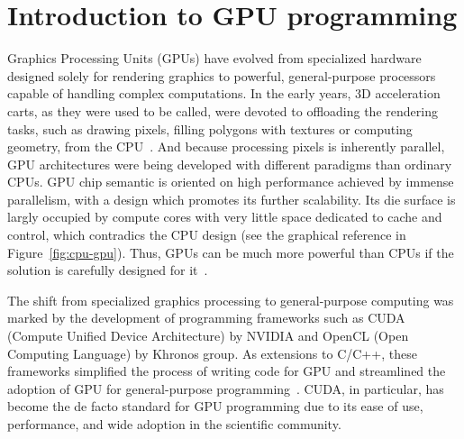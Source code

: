 \section{Introduction to GPU programming}


Graphics Processing Units (GPUs) have evolved from specialized hardware designed solely for rendering graphics to powerful, general-purpose processors capable of handling complex computations. In the early years, 3D acceleration carts, as they were used to be called, were devoted to offloading the rendering tasks, such as drawing pixels, filling polygons with textures or computing geometry, from the CPU~\cite{pratx2011gpu}. And because processing pixels is inherently parallel, GPU architectures were being developed with different paradigms than ordinary CPUs. GPU chip semantic is oriented on high performance achieved by immense parallelism, with a design which promotes its further scalability. Its die surface is largly occupied by compute cores with very little space dedicated to cache and control, which contradics the CPU design (see the graphical reference in Figure~\ref{fig:cpu-gpu}). Thus, GPUs can be much more powerful than CPUs if the solution is carefully designed for it~\cite{navarro2014survey}.

The shift from specialized graphics processing to general-purpose computing was marked by the development of programming frameworks such as CUDA (Compute Unified Device Architecture) by NVIDIA and OpenCL (Open Computing Language) by Khronos group. As extensions to C/C++, these frameworks simplified the process of writing code for GPU and streamlined the adoption of GPU for general-purpose programming~\cite{croix2009introduction}. CUDA, in particular, has become the de facto standard for GPU programming due to its ease of use, performance, and wide adoption in the scientific community.

